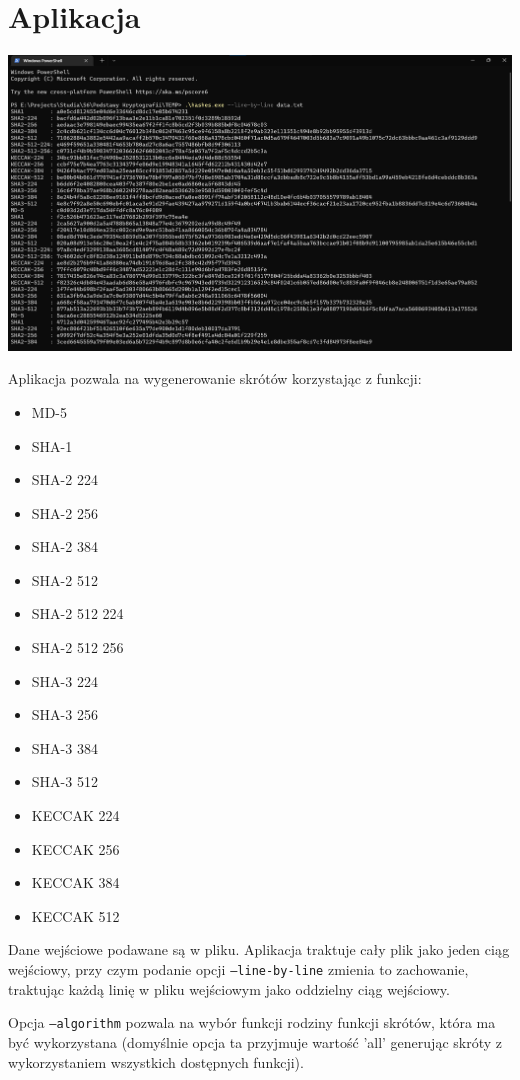 \documentclass[10pt,a4paper]{article}
\begin{document}
\section*{Aplikacja}

\includegraphics[width=\textwidth]{img/1.png}

Aplikacja pozwala na wygenerowanie skrótów korzystając z funkcji:

\begin{itemize}
    \item MD-5
    \item SHA-1
    \item SHA-2 224
    \item SHA-2 256
    \item SHA-2 384
    \item SHA-2 512
    \item SHA-2 512 224
    \item SHA-2 512 256
    \item SHA-3 224
    \item SHA-3 256
    \item SHA-3 384
    \item SHA-3 512
    \item KECCAK 224
    \item KECCAK 256
    \item KECCAK 384
    \item KECCAK 512
\end{itemize}

Dane wejściowe podawane są w pliku.
Aplikacja traktuje cały plik jako jeden ciąg wejściowy, przy czym podanie opcji \texttt{--line-by-line} zmienia to zachowanie,
traktując każdą linię w pliku wejściowym jako oddzielny ciąg wejściowy.

Opcja \texttt{--algorithm} pozwala na wybór funkcji rodziny funkcji skrótów, która ma być wykorzystana
(domyślnie opcja ta przyjmuje wartość 'all' generując skróty z wykorzystaniem wszystkich dostępnych funkcji).
\end{document}
